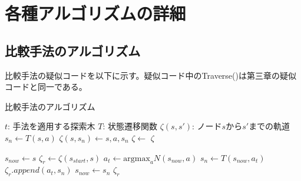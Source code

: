 \chapter{各種アルゴリズムの詳細}
\section{比較手法のアルゴリズム}
比較手法の疑似コードを以下に示す。疑似コード中のTraverse()は第三章の疑似コードと同一である。
\begin{algorithm}
    \caption{比較手法のアルゴリズム}
    \begin{algorithmic}[1]       
        \State $t$: 手法を適用する探索木
        \State $T$: 状態遷移関数
        \State $\zeta(s, s')$: ノード$s$から$s'$までの軌道
           \State $s_n \gets T(s, a)$
           \State $\zeta(s, s_n) \gets {s, a, s_n}$
           \State $\zeta \gets$ 
           \Retuen $\zeta$
        \EndFunction
        
            \State $s_{now} \gets s$
            \State $\zeta_r \gets \zeta(s_{start}, s)$
                \State $a_t \gets \textrm{argmax}_a N(s_{now}, a)$
                \State $s_n \gets T(s_{now}, a_t)$
                \State $\zeta_r.append({a_t, s_n})$
                \State $s_{now} \gets s_n$
            \EndWhile
            \Return $\zeta_r$
        \EndFunction
       
        
    \end{algorithmic}
\end{algorithm}


